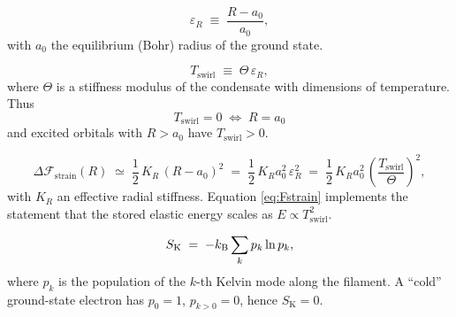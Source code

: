 \documentclass[11pt]{article}
\begin{document}
            \begin{equation}
                \varepsilon_R
                \;\equiv\;
                \frac{R - a_0}{a_0},
                \label{eq:strain_def}
            \end{equation}
            with \(a_0\) the equilibrium (Bohr) radius of the ground state.

            \begin{equation}
                T_{\text{swirl}}
                \;\equiv\;
                \Theta\,\varepsilon_R,
                \label{eq:Tswirl_def}
            \end{equation}
            where \(\Theta\) is a stiffness modulus of the condensate with dimensions of temperature.
            Thus
            \[
                T_{\text{swirl}} = 0 \;\Leftrightarrow\; R = a_0
            \]
            and excited orbitals with \(R > a_0\) have \(T_{\text{swirl}} > 0\).

            \begin{equation}
                \Delta \mathcal{F}_{\text{strain}}(R)
                \;\simeq\;
                \frac{1}{2}\,K_R \,(R - a_0)^2
                \;=\;
                \frac{1}{2}\,K_R a_0^2 \,\varepsilon_R^2
                \;=\;
                \frac{1}{2}\,K_R a_0^2 \,\left(\frac{T_{\text{swirl}}}{\Theta}\right)^2,
                \label{eq:Fstrain}
            \end{equation}
            with \(K_R\) an effective radial stiffness. Equation \eqref{eq:Fstrain} implements the
            statement that the stored elastic energy scales as \(E \propto T_{\text{swirl}}^2\).

            \begin{equation}
                S_{\mathrm{K}}
                \;=\;
                -k_{\mathrm{B}}
                \sum_{k} p_k \ln p_k,
                \label{eq:KelvinEntropy}
            \end{equation}
            where \(p_k\) is the population of the \(k\)-th Kelvin mode along the filament.
            A “cold” ground-state electron has \(p_0 = 1\), \(p_{k>0} = 0\), hence \(S_{\mathrm{K}}=0\).
\end{document}
